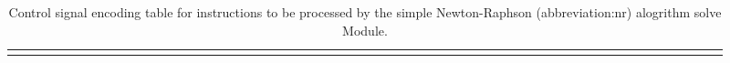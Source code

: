 \documentclass[a4paper, twoside, 11pt]{article}
\begin{document}
\begin{table}[htbp!]
                \centering
                \caption{Control signal encoding table for instructions to be processed by the simple Newton-Raphson (\gls{abbreviation:nr}) alogrithm solve Module.}
                \vspace*{0.15cm}
                \resizebox{\textwidth}{!}
                    {
\begin{tabular}{!{\vrule width 2pt}c!{\vrule width 2pt}l!{\vrule width 2pt}c!{\vrule width 2pt}cccc!{\vrule width 2pt}cccc!{\vrule width 2pt}cccc!{\vrule width 2pt}cccc!{\vrule width 2pt}cccc!{\vrule width 2pt}cccc!{\vrule width 2pt}cccc!{\vrule width 2pt}cccc!{\vrule width 2pt}cccc!{\vrule width 2pt}cccc!{\vrule width 2pt}cccc!{\vrule width 2pt}cccc!{\vrule width 2pt}cccc!{\vrule width 2pt}c!{\vrule width 2pt}}

\end{tabular}}
\end{table}
\end{document}
